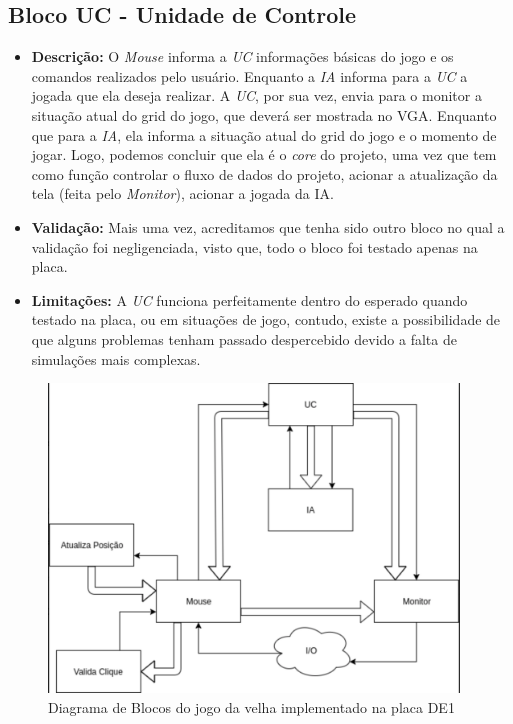 \subsection{Bloco UC - Unidade de Controle}
    \begin{itemize}
        \item \textbf{Descrição:} O \emph{Mouse} informa a \emph{UC} informações básicas do jogo e os comandos realizados pelo usuário. Enquanto a \emph{IA} informa para a \emph{UC} a jogada que ela deseja realizar. A \emph{UC}, por sua vez, envia para o monitor a situação atual do grid do jogo, que deverá ser mostrada no VGA. Enquanto que para a \emph{IA}, ela informa a situação atual do grid do jogo e o momento de jogar. Logo, podemos concluir que ela é o \emph{core} do projeto, uma vez que tem como função controlar o fluxo de dados do projeto, acionar a atualização da tela (feita pelo \emph{Monitor}), acionar a jogada da IA.
        \item \textbf{Validação:} Mais uma vez, acreditamos que tenha sido outro bloco no qual a validação foi negligenciada, visto que, todo o bloco foi testado apenas na placa.
        \item \textbf{Limitações:} A \emph{UC} funciona perfeitamente dentro do esperado quando testado na placa, ou em situações de jogo, contudo, existe a possibilidade de que alguns problemas tenham passado despercebido devido a falta de simulações mais complexas.
    \end{itemize}

\begin{figure}[h!]
\centering
\includegraphics[height=8.2cm]{imagens/diagrama.png}
\caption{Diagrama de Blocos do jogo da velha implementado na placa DE1}
\label{fig:diagrama}
\end{figure}
